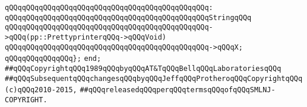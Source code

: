 \verb|qQQqqQQqqQQqqQQqqQQqqQQqqQQqqQQqqQQqqQQqqQQqqQQq:|\newline
\verb|qQQqqQQqqQQqqQQqqQQqqQQqqQQqqQQqqQQqqQQqqQQqqQQqStringqQQq|\newline
\verb|qQQqqQQqqQQqqQQqqQQqqQQqqQQqqQQqqQQqqQQqqQQqqQQq->qQQq(pp::PrettyprinterqQQq->qQQqVoid)|\newline
\verb|qQQqqQQqqQQqqQQqqQQqqQQqqQQqqQQqqQQqqQQqqQQqqQQq->qQQqX;|\newline
\verb|qQQqqQQqqQQqqQQq};|\newline
\verb|end;|\newline
\newline
\newline
\verb|##qQQqCopyrightqQQq1989qQQqbyqQQqAT&TqQQqBellqQQqLaboratoriesqQQq|\newline
\verb|##qQQqSubsequentqQQqchangesqQQqbyqQQqJeffqQQqProtheroqQQqCopyrightqQQq(c)qQQq2010-2015,|\newline
\verb|##qQQqreleasedqQQqperqQQqtermsqQQqofqQQqSMLNJ-COPYRIGHT.|\newline

